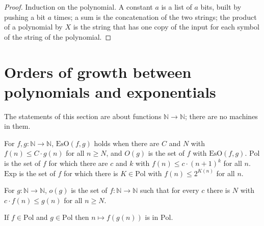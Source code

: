 \begin{proof}
  \leanok
  Induction on the polynomial. A constant $a$ is a list of $a$ bits, built by pushing a bit $a$ times; a sum is
  the concatenation of the two strings; the product of a polynomial by $X$ is the string that has one copy of
  the input for each symbol of the string of the polynomial.
\end{proof}

\section{Orders of growth between polynomials and exponentials}
\label{sec:machines-growth}

The statements of this section are about functions $\mathbb{N} \to \mathbb{N}$; there are no machines in
them.

\begin{definition}
  \label{def:machines-landau}
  \leanok
  For $f, g : \mathbb{N} \to \mathbb{N}$, $\mathrm{EsO}(f, g)$ holds when there are $C$ and $N$ with
  $f(n) \le C \cdot g(n)$ for all $n \ge N$, and $O(g)$ is the set of $f$ with $\mathrm{EsO}(f, g)$.
  $\mathrm{Pol}$ is the set of $f$ for which there are $c$ and $k$ with $f(n) \le c \cdot (n + 1)^k$ for all
  $n$. $\mathrm{Exp}$ is the set of $f$ for which there is $K \in \mathrm{Pol}$ with $f(n) \le 2^{K(n)}$ for all
  $n$.
  \own{}
  \infrastructure{}
\end{definition}

\begin{definition}
  \label{def:machines-little-o}
  \leanok
  For $g : \mathbb{N} \to \mathbb{N}$, $o(g)$ is the set of $f : \mathbb{N} \to \mathbb{N}$ such that for
  every $c$ there is $N$ with $c \cdot f(n) \le g(n)$ for all $n \ge N$.
  \own{}
  \infrastructure{}
\end{definition}

\begin{theorem}
  \label{thm:machines-pol-comp}
  \leanok
  If $f \in \mathrm{Pol}$ and $g \in \mathrm{Pol}$ then $n \mapsto f(g(n))$ is in $\mathrm{Pol}$.
  \own{}
  \infrastructure{}
\end{theorem}

